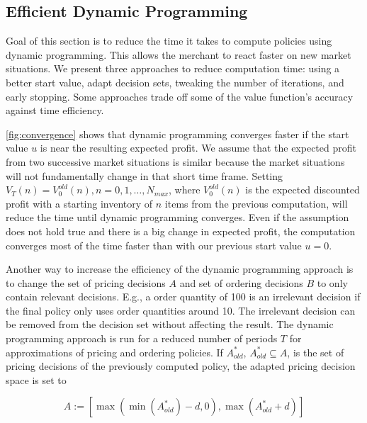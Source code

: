 
\subsection{Efficient Dynamic Programming}
\label{section:faster_dyn_prog}
Goal of this section is to reduce the time it takes to compute policies using dynamic programming.
This allows the merchant to react faster on new market situations.
We present three approaches to reduce computation time: using a better start value, adapt decision sets, tweaking the number of iterations, and early stopping.
Some approaches trade off some of the value function's accuracy against time efficiency.

\cref{fig:convergence} shows that dynamic programming converges faster if the start value $u$ is near the resulting expected profit.
We assume that the expected profit from two successive market situations is similar because the market situations will not fundamentally change in that short time frame.
Setting $V_T(n) = V_0^{old}(n), n=0, 1, \ldots, N_{max}$, where $V_0^{old}(n)$ is the expected discounted profit with a starting inventory of $n$ items from the previous computation, will reduce the time until dynamic programming converges.
Even if the assumption does not hold true and there is a big change in expected profit, the computation converges most of the time faster than with our previous start value $u = 0$.

Another way to increase the efficiency of the dynamic programming approach is to change the set of pricing decisions $A$ and set of ordering decisions $B$ to only contain relevant decisions.
E.g., a order quantity of 100 is an irrelevant decision if the final policy only uses order quantities around 10.
The irrelevant decision can be removed from the decision set without affecting the result.
The dynamic programming approach is run for a reduced number of periods $T$ for approximations of pricing and ordering policies.
If $A^*_{old}$, $A^*_{old} \subseteq A$, is the set of pricing decisions of the previously computed policy, the adapted pricing decision space is set to

\begin{equation}
A := [\max(\min(A^*_{old}) - d, 0), \max(A^*_{old} + d)]
\end{equation}

